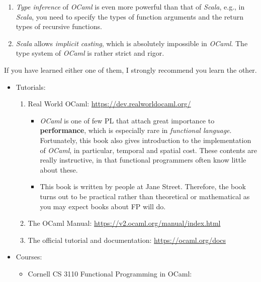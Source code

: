 \documentclass{article}
\begin{document}
\begin{itemize}
\begin{enumerate}
        \item \emph{Type inference} of \emph{OCaml} is even more powerful than that of \emph{Scala}, e.g., in \emph{Scala}, you need to specify the types of function arguments and the return types of recursive functions.
        
        \item \emph{Scala} allows \emph{implicit casting}, which is absolutely impossible in \emph{OCaml}.
        The type system of \emph{OCaml} is rather strict and rigor.
    \end{enumerate}
    If you have learned either one of them, I strongly recommend you learn the other.
    
    \begin{itemize}
        \item Tutorials:
        \begin{enumerate}
            \item Real World OCaml:
            \href{https://dev.realworldocaml.org/}{https://dev.realworldocaml.org/}
            \begin{itemize}
                \item \emph{OCaml} is one of few PL that attach great importance to \textbf{performance}, which is especially rare in \emph{functional language}.
                Fortunately, this book also gives introduction to the implementation of \emph{OCaml}, in particular, temporal and spatial cost.
                These contents are really instructive, in that functional programmers often know little about these.
                \item This book is written by people at Jane Street.
                Therefore, the book turns out to be practical rather than theoretical or mathematical as you may expect books about FP will do.
            \end{itemize}
            \item The OCaml Manual:
            \href{https://v2.ocaml.org/manual/index.html}{https://v2.ocaml.org/manual/index.html}            
            \item The official tutorial and documentation:
            \href{https://ocaml.org/docs}{https://ocaml.org/docs}
        \end{enumerate}
        \item Courses:
        \begin{itemize}
            \item Cornell CS 3110
            Functional Programming in OCaml:\\

\end{itemize}
\end{itemize}
\end{itemize}
\end{document}
